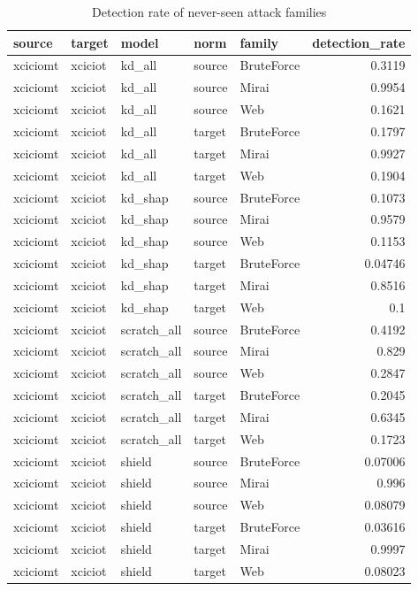 \begin{table}
\caption{Detection rate of never-seen attack families}
\begin{tabular}{lllllr}
\toprule
source & target & model & norm & family & detection_rate \\
\midrule
xciciomt & xciciot & kd_all & source & BruteForce & 0.3119 \\
xciciomt & xciciot & kd_all & source & Mirai & 0.9954 \\
xciciomt & xciciot & kd_all & source & Web & 0.1621 \\
xciciomt & xciciot & kd_all & target & BruteForce & 0.1797 \\
xciciomt & xciciot & kd_all & target & Mirai & 0.9927 \\
xciciomt & xciciot & kd_all & target & Web & 0.1904 \\
xciciomt & xciciot & kd_shap & source & BruteForce & 0.1073 \\
xciciomt & xciciot & kd_shap & source & Mirai & 0.9579 \\
xciciomt & xciciot & kd_shap & source & Web & 0.1153 \\
xciciomt & xciciot & kd_shap & target & BruteForce & 0.04746 \\
xciciomt & xciciot & kd_shap & target & Mirai & 0.8516 \\
xciciomt & xciciot & kd_shap & target & Web & 0.1 \\
xciciomt & xciciot & scratch_all & source & BruteForce & 0.4192 \\
xciciomt & xciciot & scratch_all & source & Mirai & 0.829 \\
xciciomt & xciciot & scratch_all & source & Web & 0.2847 \\
xciciomt & xciciot & scratch_all & target & BruteForce & 0.2045 \\
xciciomt & xciciot & scratch_all & target & Mirai & 0.6345 \\
xciciomt & xciciot & scratch_all & target & Web & 0.1723 \\
xciciomt & xciciot & shield & source & BruteForce & 0.07006 \\
xciciomt & xciciot & shield & source & Mirai & 0.996 \\
xciciomt & xciciot & shield & source & Web & 0.08079 \\
xciciomt & xciciot & shield & target & BruteForce & 0.03616 \\
xciciomt & xciciot & shield & target & Mirai & 0.9997 \\
xciciomt & xciciot & shield & target & Web & 0.08023 \\

\end{tabular}
\end{table}

